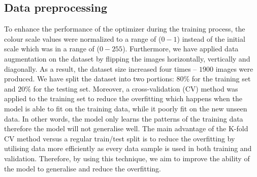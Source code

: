 \subsection{Data preprocessing}
To enhance the performance of the optimizer during the training process, the colour scale values were normalized to a range of (\(0-1\)) instead of the initial scale which was in a range of (\(0 - 255\)).	
Furthermore, we have applied data augmentation on the dataset by flipping the images horizontally, vertically and diagonally. 
As a result, the dataset size increased four times -- \(1900\)  images were produced.
We have split the dataset into two portions:  \(80\%\) for the training set and \(20\%\) for the testing set.
Moreover, a cross-validation (CV) method was applied to the training set to reduce the overfitting which happens when the model is able to fit on the training data, while it poorly fit on the new unseen data.
In other words, the model only learns the patterns of the training data therefore the model will not generalise well. 
The main advantage of the K-fold CV method versus a regular train/test split is to reduce the overfitting by utilising data more efficiently as every data sample is used in both training and validation. 
Therefore, by using this technique, we aim to improve the ability of the model to generalise and reduce the overfitting.
